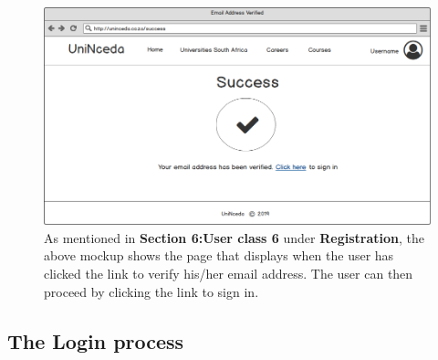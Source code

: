 \documentclass[a4paper, 12pt]{article}
\begin{document}
\begin{figure}[H]
\centering
\includegraphics[scale=0.5]{EmailAddressVerified}
\caption{As mentioned in \textbf{Section 6:User class 6} under \textbf{Registration}, the above mockup shows the page that displays when the user has clicked the link to verify his/her email address. The user can then proceed by clicking the link to sign in.}
\label{EmailAddressVerified}
\end{figure}

\FloatBarrier

\subsection{The Login process}

\setcounter{figure}{0}
\end{document}
